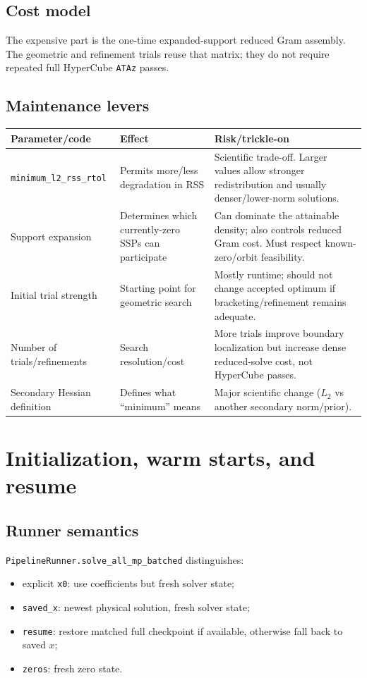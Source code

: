 \documentclass[10pt,a4paper]{article}
\newcommand{\code}[1]{\texttt{#1}}
\begin{document}
\subsection{Cost model}
The expensive part is the one-time expanded-support reduced Gram assembly. The geometric and refinement trials reuse that matrix; they do not require repeated full HyperCube \code{ATAz} passes.

\subsection{Maintenance levers}
\begin{longtable}{p{}p{}p{}}
\toprule
\textbf{Parameter/code} & \textbf{Effect} & \textbf{Risk/trickle-on}\\
\midrule\endhead
\code{minimum\_l2\_rss\_rtol} & Permits more/less degradation in RSS & Scientific trade-off. Larger values allow stronger redistribution and usually denser/lower-norm solutions.\\
Support expansion & Determines which currently-zero SSPs can participate & Can dominate the attainable density; also controls reduced Gram cost. Must respect known-zero/orbit feasibility.\\
Initial trial strength & Starting point for geometric search & Mostly runtime; should not change accepted optimum if bracketing/refinement remains adequate.\\
Number of trials/refinements & Search resolution/cost & More trials improve boundary localization but increase dense reduced-solve cost, not HyperCube passes.\\
Secondary Hessian definition & Defines what ``minimum'' means & Major scientific change ($L_2$ vs another secondary norm/prior).\\
\bottomrule
\end{longtable}

\section{Initialization, warm starts, and resume}
\subsection{Runner semantics}
\code{PipelineRunner.solve\_all\_mp\_batched} distinguishes:
\begin{itemize}
\item explicit \code{x0}: use coefficients but fresh solver state;
\item \code{saved\_x}: newest physical solution, fresh solver state;
\item \code{resume}: restore matched full checkpoint if available, otherwise fall back to saved $x$;
\item \code{zeros}: fresh zero state.
\end{itemize}
\end{document}
